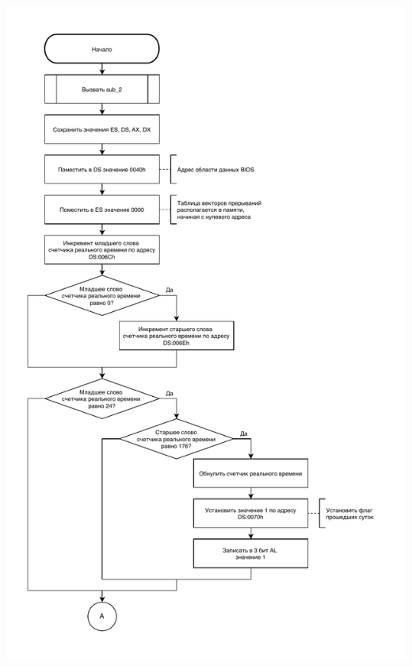 \documentclass[a4paper,14pt]{article}
\begin{document}
\begin{flushright}
	\begin{center}
		\includegraphics[height=0.98\textheight]{assets/int8h_part1.pdf}
	\end{center}
	\begin{center}

\end{center}
\end{flushright}
\end{document}
